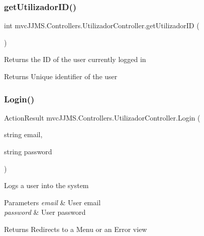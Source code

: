 \subsubsection{\texorpdfstring{get\+Utilizador\+I\+D()}{getUtilizadorID()}}
{\footnotesize\ttfamily int mvc\+J\+J\+M\+S.\+Controllers.\+Utilizador\+Controller.\+get\+Utilizador\+ID (\begin{DoxyParamCaption}{ }\end{DoxyParamCaption})\hspace{0.3cm}{\ttfamily [inline]}}



Returns the ID of the user currently logged in 

\begin{DoxyReturn}{Returns}
Unique identifier of the user
\end{DoxyReturn}
\mbox{\label{classmvc_j_j_m_s_1_1_controllers_1_1_utilizador_controller_af8335bb74fe7e7b4cbab85a176775c30}} 
\subsubsection{\texorpdfstring{Login()}{Login()}}
{\footnotesize\ttfamily Action\+Result mvc\+J\+J\+M\+S.\+Controllers.\+Utilizador\+Controller.\+Login (\begin{DoxyParamCaption}\item[{string}]{email,  }\item[{string}]{password }\end{DoxyParamCaption})\hspace{0.3cm}{\ttfamily [inline]}}



Logs a user into the system 


\begin{DoxyParams}{Parameters}
{\em email} & User email\\
\hline
{\em password} & User password\\
\hline
\end{DoxyParams}
\begin{DoxyReturn}{Returns}
Redirects to a Menu or an Error view
\end{DoxyReturn}
\mbox{\label{classmvc_j_j_m_s_1_1_controllers_1_1_utilizador_controller_a11aabb148f5c11805d2fc9955a44a91d}} 
